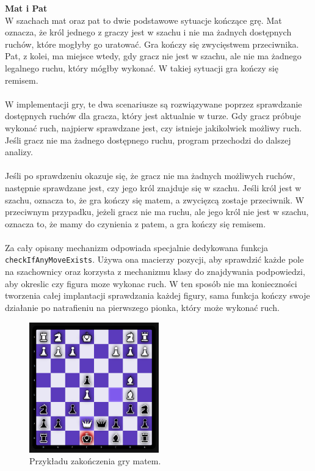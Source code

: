 \documentclass[12pt,a4paper]{article}
\begin{document}
\newpage

\noindent \textbf{Mat i Pat}\\
W szachach mat oraz pat to dwie podstawowe sytuacje kończące grę. Mat oznacza, że król jednego z graczy jest w szachu i nie ma żadnych dostępnych ruchów, które mogłyby go uratować. Gra kończy się zwycięstwem przeciwnika. Pat, z kolei, ma miejsce wtedy, gdy gracz nie jest w szachu, ale nie ma żadnego legalnego ruchu, który mógłby wykonać. W takiej sytuacji gra kończy się remisem.
\\\\
W implementacji gry, te dwa scenariusze są rozwiązywane poprzez sprawdzanie dostępnych ruchów dla gracza, który jest aktualnie w turze. Gdy gracz próbuje wykonać ruch, najpierw sprawdzane jest, czy istnieje jakikolwiek możliwy ruch. Jeśli gracz nie ma żadnego dostępnego ruchu, program przechodzi do dalszej analizy.
\\\\
Jeśli po sprawdzeniu okazuje się, że gracz nie ma żadnych możliwych ruchów, następnie sprawdzane jest, czy jego król znajduje się w szachu. Jeśli król jest w szachu, oznacza to, że gra kończy się matem, a zwycięzcą zostaje przeciwnik. W przeciwnym przypadku, jeżeli gracz nie ma ruchu, ale jego król nie jest w szachu, oznacza to, że mamy do czynienia z patem, a gra kończy się remisem.
\\\\
Za cały opisany mechanizm odpowiada specjalnie dedykowana funkcja \texttt{checkIfAnyMoveExists}. Używa ona macierzy pozycji, aby sprawdzić każde pole na szachownicy oraz korzysta z mechanizmu klasy do znajdywania podpowiedzi, aby okreslic czy figura moze wykonac ruch. W ten sposób nie ma konieczności tworzenia całej implantacji sprawdzania każdej figury, sama funkcja kończy swoje działanie po natrafieniu na pierwszego pionka, który może wykonać ruch.

\vspace{0.5cm}
\begin{figure}[h!]
    \centering
    \includegraphics[width=0.5\textwidth]{images/imp_front_checkmate.png}
    \caption{Przykładu zakończenia gry matem.}
\end{figure}
\vspace{0.5cm}
\end{document}
